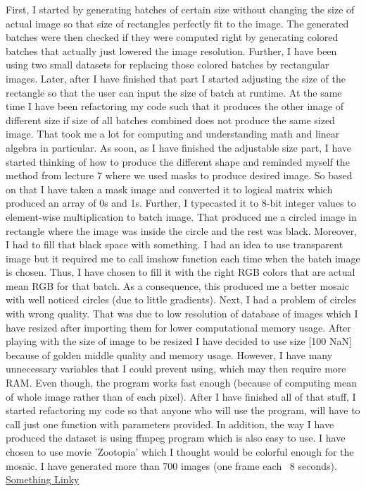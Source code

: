 \documentclass{IEEEtran}
\begin{document}
First, I started by generating batches of certain size without changing the size of actual image so that size of rectangles perfectly fit to the image. The generated batches were then checked if they were computed right by generating colored batches that actually just lowered the image resolution. Further, I have been using two small datasets for replacing those colored batches by rectangular images. Later, after I have finished that part I started adjusting the size of the rectangle so that the user can input the size of batch at runtime. At the same time I have been refactoring my code such that it produces the other image of different size if size of all batches combined does not produce the same sized image. That took me a lot for computing and understanding math and linear algebra in particular. As soon, as I have finished the adjustable size part, I have started thinking of how to produce the different shape and reminded myself the method from lecture 7 where we used masks to produce desired image. So based on that I have taken a mask image and converted it to logical matrix which produced an array of 0s and 1s. Further, I typecasted it to 8-bit integer values to element-wise multiplication to batch image. That produced me a circled image in rectangle where the image was inside the circle and the rest was black. Moreover, I had to fill that black space with something. I had an idea to use transparent image but it required me to call imshow function each time when the batch image is chosen. Thus, I have chosen to fill it with the right RGB colors that are actual mean RGB for that batch. As a consequence, this produced me a better mosaic with well noticed circles (due to little gradients). Next, I had a problem of circles with wrong quality. That was due to low resolution of database of images which I have resized after importing them for lower computational memory usage. After playing with the size of image to be resized I have decided to use size [100 NaN] because of golden middle quality and memory usage. However, I have many unnecessary variables that I could prevent using, which may then require more RAM. Even though, the program works fast enough (because of computing mean of whole image rather than of each pixel). After I have finished all of that stuff, I started refactoring my code so that anyone who will use the program, will have to call just one function with parameters provided.
In addition, the way I have produced the dataset is using ffmpeg program which is also easy to use. I have chosen to use movie 'Zootopia' which I thought would be colorful enough for the mosaic. I have generated more than 700 images (one frame each ~8 seconds). \href{http://www.sharelatex.com}{Something Linky}
\end{document}
